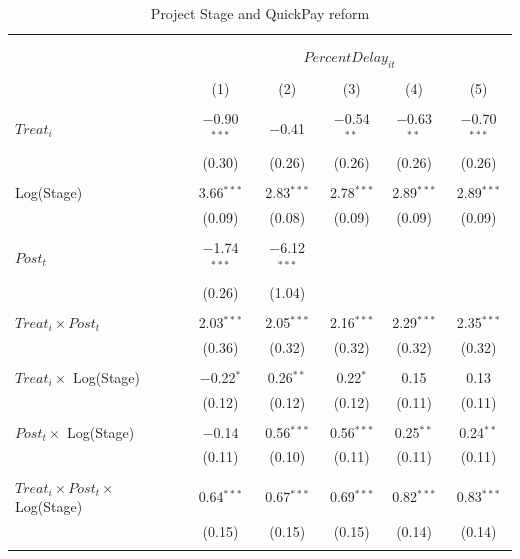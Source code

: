 \documentclass[
]{article}
\begin{document}
\begin{table}[H] \centering 
  \caption{Project Stage and QuickPay reform} 
  \label{} 
\small 
\begin{tabular}{@{\extracolsep{-2pt}}lccccc} 
\\[-1.8ex]\hline 
\hline \\[-1.8ex] 
\\[-1.8ex] & \multicolumn{5}{c}{$PercentDelay_{it}$  } \\ 
\\[-1.8ex] & (1) & (2) & (3) & (4) & (5)\\ 
\hline \\[-1.8ex] 
 $Treat_i$ & $-$0.90$^{***}$ & $-$0.41 & $-$0.54$^{**}$ & $-$0.63$^{**}$ & $-$0.70$^{***}$ \\ 
  & (0.30) & (0.26) & (0.26) & (0.26) & (0.26) \\ 
  & & & & & \\ 
 Log(Stage) & 3.66$^{***}$ & 2.83$^{***}$ & 2.78$^{***}$ & 2.89$^{***}$ & 2.89$^{***}$ \\ 
  & (0.09) & (0.08) & (0.09) & (0.09) & (0.09) \\ 
  & & & & & \\ 
 $Post_t$ & $-$1.74$^{***}$ & $-$6.12$^{***}$ &  &  &  \\ 
  & (0.26) & (1.04) &  &  &  \\ 
  & & & & & \\ 
 $Treat_i \times Post_t$ & 2.03$^{***}$ & 2.05$^{***}$ & 2.16$^{***}$ & 2.29$^{***}$ & 2.35$^{***}$ \\ 
  & (0.36) & (0.32) & (0.32) & (0.32) & (0.32) \\ 
  & & & & & \\ 
 $Treat_i \times$ Log(Stage) & $-$0.22$^{*}$ & 0.26$^{**}$ & 0.22$^{*}$ & 0.15 & 0.13 \\ 
  & (0.12) & (0.12) & (0.12) & (0.11) & (0.11) \\ 
  & & & & & \\ 
 $Post_t \times$ Log(Stage) & $-$0.14 & 0.56$^{***}$ & 0.56$^{***}$ & 0.25$^{**}$ & 0.24$^{**}$ \\ 
  & (0.11) & (0.10) & (0.11) & (0.11) & (0.11) \\ 
  & & & & & \\ 
 $Treat_i \times Post_t \times$ Log(Stage) & 0.64$^{***}$ & 0.67$^{***}$ & 0.69$^{***}$ & 0.82$^{***}$ & 0.83$^{***}$ \\ 
  & (0.15) & (0.15) & (0.15) & (0.14) & (0.14) \\ 
  & & & & & \\ 

\end{tabular}
\end{table}
\end{document}
